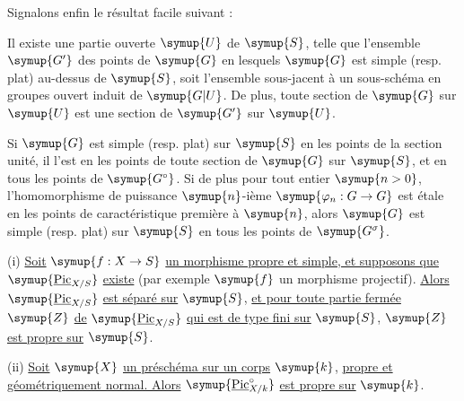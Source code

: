 Signalons enfin le résultat facile suivant :

 Il existe une partie ouverte $\symup{U}$ de $\symup{S}$, telle que
l'ensemble $\symup{G'}$ des points de $\symup{G}$ en lesquels $\symup{G}$ est simple (resp. plat)
au-dessus de $\symup{S}$, soit l'ensemble sous-jacent à un sous-schéma en groupes ouvert
induit de $\symup{G|U}$. De plus, toute section de $\symup{G}$ sur $\symup{U}$ est une section de $\symup{G'}$
sur $\symup{U}$.

 Si $\symup{G}$ est simple (resp. plat) sur $\symup{S}$ en les points
de la section unité, il l'est en les points de toute section de $\symup{G}$ sur $\symup{S}$,
et en tous les points de $\symup{G^\circ}$. Si de plus pour tout entier $\symup{n>0}$,
l'homomorphisme de puissance $\symup{n}$-ième
$\symup{\varphi_n:G\to G}$ est étale en les points de caractéristique
première à $\symup{n}$, alors $\symup{G}$ est simple (resp. plat) sur $\symup{S}$ en tous les points de
$\symup{G^\sigma}$.



\noindent(i) \uline{Soit} $\symup{f:X\to S}$ \uline{un morphisme propre et simple, et
supposons que} $\symup{\underline{\operatorname{Pic}}_{X/S}}$ \uline{existe} (par exemple $\symup{f}$ un morphisme projectif). \uline{Alors} $\symup{\underline{\operatorname{Pic}}_{X/S}}$ \uline{est séparé sur} $\symup{S}$, \uline{et pour toute
partie fermée} $\symup{Z}$ \uline{de} $\symup{\underline{\operatorname{Pic}}_{X/S}}$ \uline{qui est de type fini sur} $\symup{S}$,
$\symup{Z}$ \uline{est propre sur} $\symup{S}$.

\noindent(ii) \uline{Soit} $\symup{X}$ \uline{un préschéma sur un corps} $\symup{k}$, \uline{propre et géométriquement
normal. Alors} $\symup{\underline{\operatorname{Pic}}_{X/k}^\circ}$ \uline{est propre sur} $\symup{k}$.



